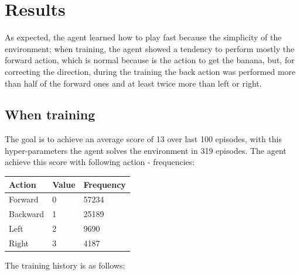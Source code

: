 \documentclass{article}
\begin{document}
\section{Results}
As expected, the agent learned how to play fast because the simplicity of the environment; when training, the agent showed a tendency to perform mostly the forward action, which is normal because is the action to get the banana, but, for correcting the direction, during the training the back action was performed more than half of the forward ones and at least twice more than left or right.
\subsection{When training}
The goal is to achieve an average score of 13 over last 100 episodes, with this hyper-parameters the agent solves the environment in 319 episodes.\newline
The agent achieve this score with following action - frequencies:
\begin{table}[!htbp] 
\center
\begin{tabular}{l|l|l}
Action         & Value & Frequency\\
\hline
Forward       & 0 & 57234 \\
Backward      & 1 & 25189 \\
Left 	      & 2 &  9690\\
Right 	      & 3 &	 4187
\end{tabular}
\end{table}
\newline The training history is as follows:
\end{document}
